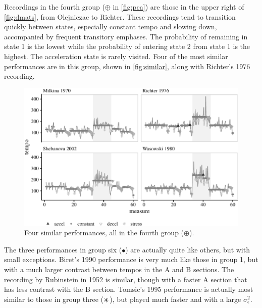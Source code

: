 \documentclass[aoas]{imsart}
\begin{document}
Recordings in the fourth group ($\oplus$ in \autoref{fig:pca}) are
those in the upper right of \autoref{fig:dmats}, from Olejniczac to
Richter. These recordings
tend to transition quickly between states, especially constant
tempo and slowing down, accompanied by frequent transitory
emphases. The probability of remaining in state 1 is the lowest while
the probability of entering state 2 from state 1 is 
the highest. The acceleration state is rarely visited. Four of
the most similar performances are in this group, shown in
\autoref{fig:similar}, along with Richter's 1976 recording.
\begin{figure}[t]
  \centering
  \includegraphics[width=.9\linewidth]{similar-perfs-1}
  \caption{Four similar performances, all in the fourth group ($\oplus$).}
  \label{fig:similar}
\end{figure}

The three performances in group six ($\bullet$) are actually quite like others,
but with small exceptions. Biret's 1990 performance is very much like
those in group 1, but with a much larger contrast between tempos in
the A and B sections. The recording by Rubinstein in 1952 is similar,
though with a faster A section that has less contrast with the B
section. Tomsic's 1995 performance is actually most
similar to those in group three ($\mathrlap{+}\times$), but played much faster and
with a large $\sigma^2_\epsilon$.
\end{document}

